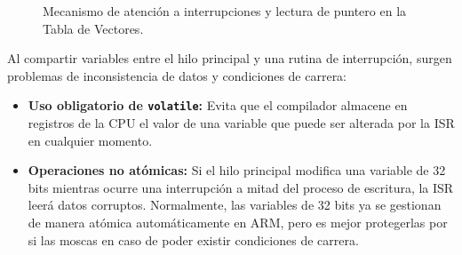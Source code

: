 \documentclass[../main.tex]{subfiles}
\begin{document}
\begin{figure}[htbp]
        \caption{Mecanismo de atención a interrupciones y lectura de puntero en la Tabla de Vectores.}
        \label{fig:interrupt_vector_flow}
    \end{figure}

    

    Al compartir variables entre el hilo principal y una rutina de interrupción, surgen problemas de inconsistencia de datos y condiciones de carrera:

    \begin{itemize}
        \item \textbf{Uso obligatorio de \lstinline|volatile|:} Evita que el compilador almacene en registros de la CPU el valor de una variable que puede ser alterada por la ISR en cualquier momento.
        \item \textbf{Operaciones no atómicas:} Si el hilo principal modifica una variable de 32 bits mientras ocurre una interrupción a mitad del proceso de escritura, la ISR leerá datos corruptos. Normalmente, las variables de 32 bits ya se gestionan de manera atómica automáticamente en ARM, pero es mejor protegerlas por si las moscas en caso de poder existir condiciones de carrera.
    \end{itemize}
\end{document}
